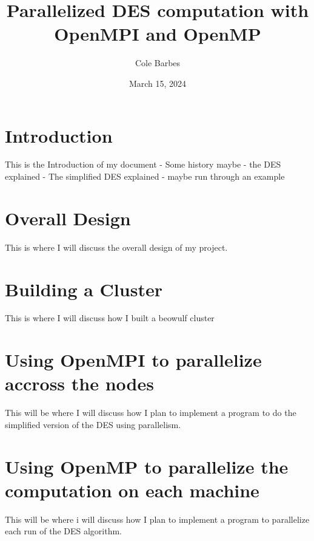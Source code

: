 \documentclass[12pt]{article}
\title{Parallelized DES computation with OpenMPI and OpenMP}
\author{Cole Barbes}
\date{March 15, 2024} %
\begin{document}
\maketitle

\section*{Introduction}
This is the Introduction of my document
- Some history maybe
- the DES explained
- The simplified DES explained
- maybe run through an example 

\section*{Overall Design}
This is where I will discuss the overall design of my project.

\section*{Building a Cluster}
This is where I will discuss how I built a beowulf cluster 

\section*{Using OpenMPI to parallelize accross the nodes}
This will be where I will discuss how I plan to implement a program to do the simplified version of the DES using parallelism.

\section*{Using OpenMP to parallelize the computation on each machine}
This will be where i will discuss how I plan to implement a program to parallelize each run of the DES algorithm.
\end{document}

